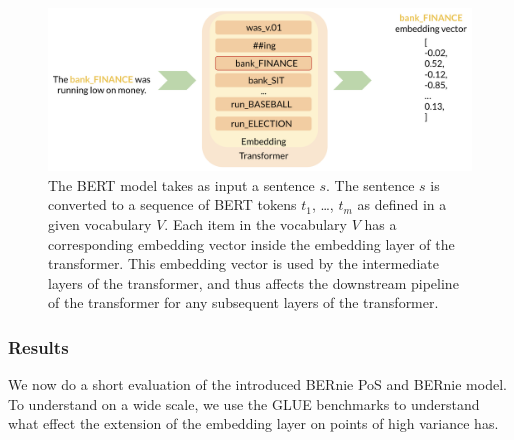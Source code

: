 \documentclass[a4paper,12pt,twoside,openright]{report}
\begin{document}
\begin{figure}[H]
	\center
  \includegraphics[width=\linewidth]{./assets/experiments/pipeline_model_BERnie_meaning.png}
  \caption{The BERT model takes as input a sentence $s$. The sentence $s$ is converted to a sequence of BERT tokens $t_1$, \ldots, $t_m$ as defined in a given vocabulary $V$.
Each item in the vocabulary $V$ has a corresponding embedding vector inside the embedding layer of the transformer.
This embedding vector is used by the intermediate layers of the transformer, and thus affects the downstream pipeline of the transformer for any subsequent layers of the transformer.}
  \label{fig:cbow_skipgram}
\end{figure}


\subsubsection{Results}

We now do a short evaluation of the introduced BERnie PoS and BERnie model.
To understand on a wide scale, we use the GLUE benchmarks to understand what effect the extension of the embedding layer on points of high variance has.
\end{document}
